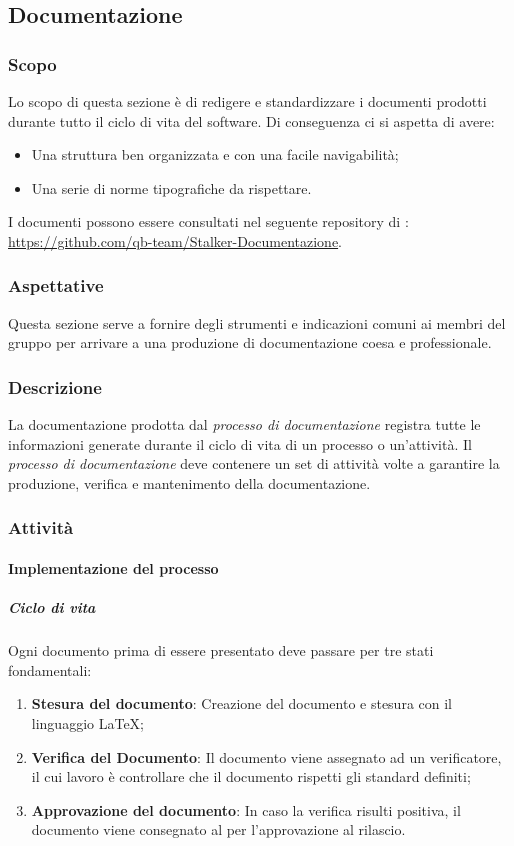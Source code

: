 \subsection{Documentazione}
\subsubsection{Scopo}
Lo scopo di questa sezione è di redigere e standardizzare i documenti prodotti durante tutto il ciclo di vita del software. 
Di conseguenza ci si aspetta di avere:
\begin{itemize}
\item Una struttura ben organizzata e con una facile navigabilità;
\item Una serie di norme tipografiche da rispettare.
\end{itemize}
I documenti possono essere consultati nel seguente repository di : \url{https://github.com/qb-team/Stalker-Documentazione}.
\subsubsection{Aspettative}
Questa sezione serve a fornire degli strumenti e indicazioni comuni ai membri del gruppo per arrivare a una produzione di documentazione coesa e professionale.

\subsubsection{Descrizione}
La documentazione prodotta dal \textit{processo di documentazione} registra tutte le informazioni generate durante il ciclo di vita di un processo o un'attività.
Il \textit{processo di documentazione} deve contenere un set di attività volte a garantire la produzione, verifica e mantenimento della documentazione.

\subsubsection{Attività}

\paragraph{Implementazione del processo}
\subparagraph*{Ciclo di vita}
Ogni documento prima di essere presentato deve passare per tre stati fondamentali:
\begin{enumerate}
\item \textbf{Stesura del documento}: Creazione del documento e stesura con il linguaggio \LaTeX;
\item \textbf{Verifica del Documento}: Il documento viene assegnato ad un verificatore, il cui lavoro è controllare che il documento rispetti gli standard definiti;
\item \textbf{Approvazione del documento}: In caso la verifica risulti positiva, il documento viene consegnato al \Responsabile{} per l'approvazione al rilascio.
\end{enumerate}

